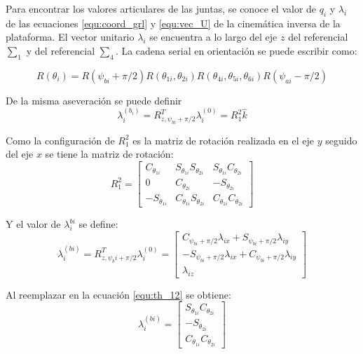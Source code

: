 \documentclass[letterpaper, 12pt]{article}
\begin{document}
Para encontrar los valores articulares de las juntas, se conoce el valor de $q_i$ y $\lambda_i$ de las ecuaciones \ref{equ:coord_grl} y \ref{equ:vec_U} de la cinemática inversa de la plataforma. El vector unitario $\lambda_i$ se encuentra a lo largo del eje $z$ del referencial $\sum_1$ y del referencial $\sum_4$. La cadena serial en orientación se puede escribir como:

\begin{equation} \label{equ:th_12-46}
R(\theta_i) = R(\psi_{bi}+\pi/2)R(\theta_{1i},\theta_{2i})R(\theta_{4i},\theta_{5i},\theta_{6i})R(\psi_{ai}-\pi/2)
\end{equation}

De la misma aseveración se puede definir
\begin{equation} \label{equ:th_12}
\lambda_i^{(b_i)} = R^T_{z,\psi_{bi}+\pi/2} \lambda_i^{(0)} =R_1^2 \hat{k}
\end{equation}

Como la configuración de $R_1^2$ es la matriz de rotación realizada en el eje $y$ seguido del eje $x$ se tiene la matriz de rotación:
\begin{equation}
R_1^2 = \begin{bmatrix}
C_{\theta_{1i}} & S_{\theta_{1i}} S_{\theta_{2i}} & S_{\theta_{1i}} C_{\theta_{2i}}\\
0 & C_{\theta_{2i}} & -S_{\theta_{2i}}\\
-S_{\theta_{1i}} & C_{\theta_{1i}} S_{\theta_{2i}} & C_{\theta_{1i}} C_{\theta_{2i}}
\end{bmatrix}
\end{equation}

Y el valor de $\lambda_i^{bi}$ se define:
\begin{equation}
\lambda_i^{(bi)} = R^T_{z,\psi_bi+\pi/2} \lambda_i^{(0)} = \begin{bmatrix}
C_{\psi_{bi}+\pi/2} \lambda_{ix} + S_{\psi_{bi}+\pi/2} \lambda_{iy} \\
-S_{\psi_{bi}+\pi/2} \lambda_{ix} + C_{\psi_{bi}+\pi/2} \lambda_{iy} \\
\lambda_{iz}
\end{bmatrix}
\end{equation}

Al reemplazar en la ecuación \ref{equ:th_12} se obtiene:
\begin{equation}
\lambda_i^{(bi)} = \begin{bmatrix}
S_{\theta_{1i}} C_{\theta_{2i}}\\
-S_{\theta_{2i}}\\
C_{\theta_{1i}} C_{\theta_{2i}}
\end{bmatrix}
\end{equation}
\end{document}
